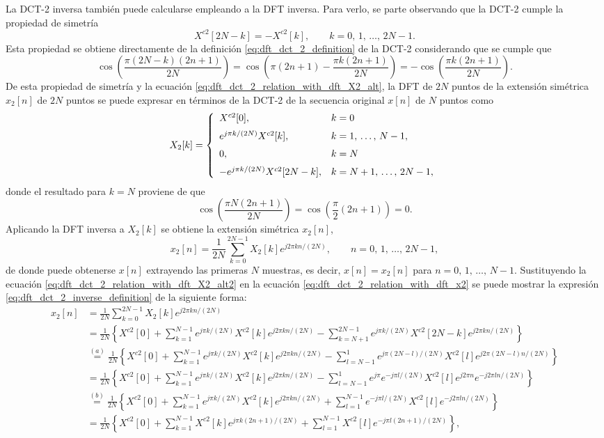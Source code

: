 \documentclass[a4paper]{report}
\begin{document}
La DCT-2 inversa también puede calcularse empleando a la DFT inversa. Para verlo, se parte observando que la DCT-2 cumple la propiedad de simetría 
\[
 X^{c2}[2N-k]=-X^{c2}[k],
 \qquad 
 k=0,\,1,\,\dots,\,2N-1.
\]
Esta propiedad se obtiene directamente de la definición \ref{eq:dft_dct_2_definition} de la DCT-2 considerando que se cumple que 
\[
 \cos\left(\frac{\pi (2N-k)(2n+1)}{2N}\right)=\cos\left(\pi(2n+1)-\frac{\pi k(2n+1)}{2N}\right)
 =-\cos\left(\frac{\pi k(2n+1)}{2N}\right).
\]
De esta propiedad de simetría y la ecuación \ref{eq:dft_dct_2_relation_with_dft_X2_alt}, la DFT de \(2N\) puntos de la extensión simétrica \(x_2[n]\) de \(2N\) puntos se puede expresar en términos de la DCT-2 de la secuencia original \(x[n]\) de \(N\) puntos como 
\begin{equation}\label{eq:dft_dct_2_relation_with_dft_X2_alt2}
 X_2[k]= 
 \left\{
 \begin{array}{ll}
  X^{c2}[0], & k=0\\[\medskipamount]
  e^{j\pi k/(2N)}X^{c2}[k], & k=1,\,\dots,\,N-1,\\[\medskipamount]
  0, &k=N\\[\medskipamount]
  -e^{j\pi k/(2N)}X^{c2}[2N-k], & k=N+1,\,\dots,\,2N-1,
 \end{array}
 \right. 
\end{equation}
donde el resultado para \(k=N\) proviene de que 
\[
 \cos\left(\frac{\pi N(2n+1)}{2N}\right)=\cos\left(\frac{\pi}{2}(2n+1)\right)=0.
\]
Aplicando la DFT inversa a \(X_2[k]\) se obtiene la extensión simétrica \(x_2[n]\),
\begin{equation}\label{eq:dft_dct_2_relation_with_dft_x2}
 x_2[n]=\frac{1}{2N}\sum_{k=0}^{2N-1}X_2[k]e^{j2\pi kn/(2N)},
 \qquad 
 n=0,\,1,\,\dots,\,2N-1, 
\end{equation}
de donde puede obtenerse \(x[n]\) extrayendo las primeras \(N\) muestras, es decir, \(x[n]=x_2[n]\) para \(n=0,\,1,\,\dots,\,N-1\). Sustituyendo la ecuación \ref{eq:dft_dct_2_relation_with_dft_X2_alt2} en la ecuación  \ref{eq:dft_dct_2_relation_with_dft_x2} se puede mostrar la expresión \ref{eq:dft_dct_2_inverse_definition} de la siguiente forma:
\begin{align*}
 x_2[n]&=\frac{1}{2N}\sum_{k=0}^{2N-1}X_2[k]e^{j2\pi kn/(2N)}\\
  &=\frac{1}{2N}\left\{X^{c2}[0]+\sum_{k=1}^{N-1}e^{j\pi k/(2N)}X^{c2}[k]e^{j2\pi kn/(2N)}-\sum_{k=N+1}^{2N-1}e^{j\pi k/(2N)}X^{c2}[2N-k]e^{j2\pi kn/(2N)}\right\}\\
  &\overset{(a)}{=}\frac{1}{2N}\left\{X^{c2}[0]+\sum_{k=1}^{N-1}e^{j\pi k/(2N)}X^{c2}[k]e^{j2\pi kn/(2N)}-\sum_{l=N-1}^{1}e^{j\pi(2N-l)/(2N)}X^{c2}[l]e^{j2\pi(2N-l)n/(2N)}\right\}\\
  &=\frac{1}{2N}\left\{X^{c2}[0]+\sum_{k=1}^{N-1}e^{j\pi k/(2N)}X^{c2}[k]e^{j2\pi kn/(2N)}-\sum_{l=N-1}^{1}e^{j\pi}e^{-j\pi l/(2N)}X^{c2}[l]e^{j2\pi n}e^{-j2\pi ln/(2N)}\right\}\\
  &\overset{(b)}{=}\frac{1}{2N}\left\{X^{c2}[0]+\sum_{k=1}^{N-1}e^{j\pi k/(2N)}X^{c2}[k]e^{j2\pi kn/(2N)}+\sum_{l=1}^{N-1}e^{-j\pi l/(2N)}X^{c2}[l]e^{-j2\pi ln/(2N)}\right\}\\
  &=\frac{1}{2N}\left\{X^{c2}[0]+\sum_{k=1}^{N-1}X^{c2}[k]e^{j\pi k(2n+1)/(2N)}+\sum_{l=1}^{N-1}X^{c2}[l]e^{-j\pi l(2n+1)/(2N)}\right\},
\end{align*}
\end{document}
